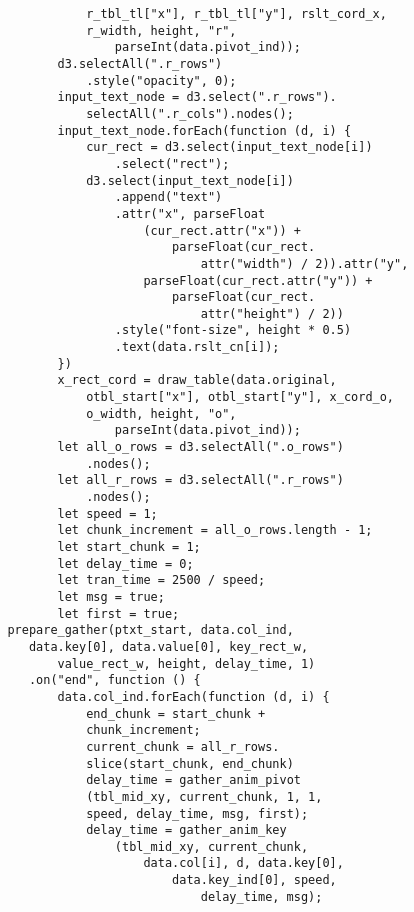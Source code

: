 \begin{lstlisting}
                    r_tbl_tl["x"], r_tbl_tl["y"], rslt_cord_x,
                    r_width, height, "r", 
                        parseInt(data.pivot_ind));
                d3.selectAll(".r_rows")
                    .style("opacity", 0);
                input_text_node = d3.select(".r_rows").
                    selectAll(".r_cols").nodes();
                input_text_node.forEach(function (d, i) {
                    cur_rect = d3.select(input_text_node[i])
                        .select("rect");
                    d3.select(input_text_node[i])
                        .append("text")
                        .attr("x", parseFloat
                            (cur_rect.attr("x")) +     
                                parseFloat(cur_rect.
                                    attr("width") / 2)).attr("y", 
                            parseFloat(cur_rect.attr("y")) + 
                                parseFloat(cur_rect.
                                    attr("height") / 2))
                        .style("font-size", height * 0.5)
                        .text(data.rslt_cn[i]);
                })
                x_rect_cord = draw_table(data.original, 
                    otbl_start["x"], otbl_start["y"], x_cord_o,
                    o_width, height, "o", 
                        parseInt(data.pivot_ind));
                let all_o_rows = d3.selectAll(".o_rows")
                    .nodes();
                let all_r_rows = d3.selectAll(".r_rows")
                    .nodes();
                let speed = 1;
                let chunk_increment = all_o_rows.length - 1;
                let start_chunk = 1;
                let delay_time = 0;
                let tran_time = 2500 / speed;
                let msg = true;
                let first = true;
         prepare_gather(ptxt_start, data.col_ind, 
            data.key[0], data.value[0], key_rect_w, 
                value_rect_w, height, delay_time, 1)
            .on("end", function () {
                data.col_ind.forEach(function (d, i) {
                    end_chunk = start_chunk + 
                    chunk_increment;
                    current_chunk = all_r_rows.
                    slice(start_chunk, end_chunk)
                    delay_time = gather_anim_pivot
                    (tbl_mid_xy, current_chunk, 1, 1, 
                    speed, delay_time, msg, first);
                    delay_time = gather_anim_key
                        (tbl_mid_xy, current_chunk, 
                            data.col[i], d, data.key[0], 
                                data.key_ind[0], speed, 
                                    delay_time, msg);

\end{lstlisting}
